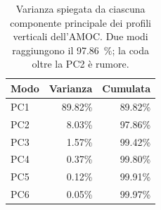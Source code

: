 \begin{table}[!ht]
    \centering
    \small
    \caption[Varianza spiegata dai modi PCA verticali.]{Varianza spiegata
    da ciascuna componente principale dei profili verticali dell'AMOC. Due modi
    raggiungono il \SI{97.86}{\percent}; la coda oltre la PC2 è rumore.}
    \label{tab:pca-variance}
    \begin{tabular}{@{}lrr@{}}
        \toprule
        \textbf{Modo} & \textbf{Varianza} & \textbf{Cumulata} \\
        \midrule
        PC1 & 89.82\% & 89.82\% \\
        PC2 &  8.03\% & 97.86\% \\
        PC3 &  1.57\% & 99.42\% \\
        PC4 &  0.37\% & 99.80\% \\
        PC5 &  0.12\% & 99.91\% \\
        PC6 &  0.05\% & 99.97\% \\
        \bottomrule
    \end{tabular}
\end{table}
